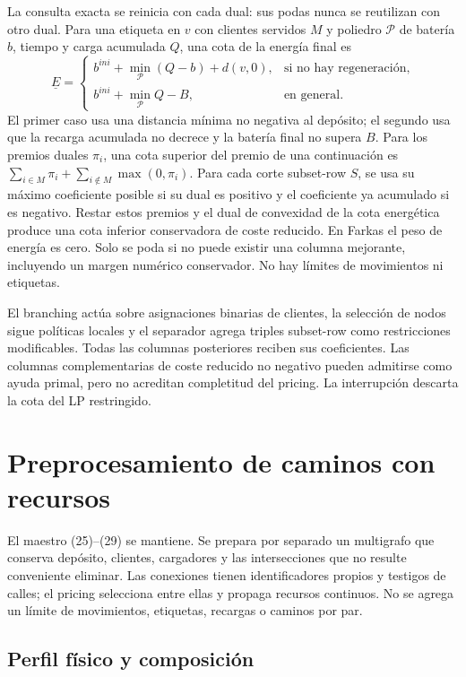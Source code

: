 \documentclass[11pt,a4paper]{article}
\begin{document}
La consulta exacta se reinicia con cada dual: sus podas nunca se reutilizan
con otro dual. Para una etiqueta en $v$ con clientes servidos $M$ y poliedro
$\mathcal P$ de batería $b$, tiempo y carga acumulada $Q$, una cota de la
energía final es
\[
\underline E=
\begin{cases}
b^{ini}+\min_{\mathcal P}(Q-b)+d(v,0),&\text{si no hay regeneración},\\
b^{ini}+\min_{\mathcal P}Q-B,&\text{en general}.
\end{cases}
\]
El primer caso usa una distancia mínima no negativa al depósito; el segundo
usa que la recarga acumulada no decrece y la batería final no supera $B$.
Para los premios duales $\pi_i$, una cota superior del premio de una continuación
es $\sum_{i\in M}\pi_i+\sum_{i\notin M}\max(0,\pi_i)$.
Para cada corte subset-row $S$, se usa su máximo coeficiente posible si su
dual es positivo y el coeficiente ya acumulado si es negativo.
Restar estos premios y el dual de convexidad de la cota energética produce
una cota inferior conservadora de coste reducido. En Farkas el peso de energía
es cero. Solo se poda si no puede existir una columna mejorante, incluyendo
un margen numérico conservador. No hay límites de movimientos ni etiquetas.

El branching actúa sobre asignaciones binarias de clientes, la selección de
nodos sigue políticas locales y el separador agrega triples subset-row como
restricciones modificables. Todas las columnas posteriores reciben sus
coeficientes. Las columnas complementarias de coste reducido no negativo
pueden admitirse como ayuda primal, pero no acreditan completitud del pricing.
La interrupción descarta la cota del LP restringido.

\clearpage
\section{Preprocesamiento de caminos con recursos}

El maestro (25)--(29) se mantiene. Se prepara por separado un multigrafo que
conserva depósito, clientes, cargadores y las intersecciones que no resulte
conveniente eliminar. Las conexiones tienen identificadores propios y testigos
de calles; el pricing selecciona entre ellas y propaga recursos continuos.
No se agrega un límite de movimientos, etiquetas, recargas o caminos por par.

\subsection{Perfil físico y composición}
\end{document}
